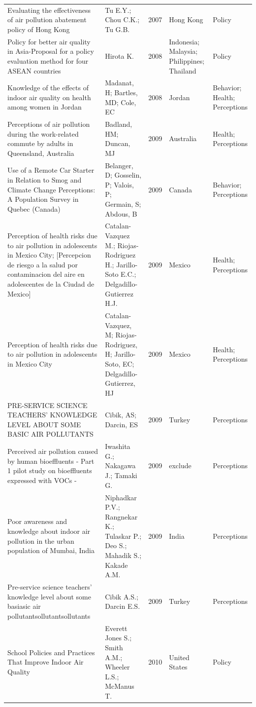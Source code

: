 {\begin{longtable}[t]{p{6cm}p{3cm}lp{3cm}p{3cm}}
Evaluating the effectiveness of air pollution abatement policy of Hong Kong & Tu E.Y.; Chou C.K.; Tu G.B. & 2007 & Hong Kong & Policy\\
\addlinespace
Policy for better air quality in Asia-Proposal for a policy evaluation method for four ASEAN countries & Hirota K. & 2008 & Indonesia; Malaysia; Philippines; Thailand & Policy\\
Knowledge of the effects of indoor air quality on health among women in Jordan & Madanat, H; Bartles, MD; Cole, EC & 2008 & Jordan & Behavior; Health; Perceptions\\
Perceptions of air pollution during the work-related commute by adults in Queensland, Australia & Badland, HM; Duncan, MJ & 2009 & Australia & Health; Perceptions\\
Use of a Remote Car Starter in Relation to Smog and Climate Change Perceptions: A Population Survey in Quebec (Canada) & Belanger, D; Gosselin, P; Valois, P; Germain, S; Abdous, B & 2009 & Canada & Behavior; Perceptions\\
Perception of health risks due to air pollution in adolescents in Mexico City; [Percepcion de riesgo a la salud por contaminacion del aire en adolescentes de la Ciudad de Mexico] & Catalan-Vazquez M.; Riojas-Rodriguez H.; Jarillo-Soto E.C.; Delgadillo-Gutierrez H.J. & 2009 & Mexico & Health; Perceptions\\
\addlinespace
Perception of health risks due to air pollution in adolescents in Mexico City & Catalan-Vazquez, M; Riojas-Rodriguez, H; Jarillo-Soto, EC; Delgadillo-Gutierrez, HJ & 2009 & Mexico & Health; Perceptions\\
PRE-SERVICE SCIENCE TEACHERS' KNOWLEDGE LEVEL ABOUT SOME BASIC AIR POLLUTANTS & Cibik, AS; Darcin, ES & 2009 & Turkey & Perceptions\\
Perceived air pollution caused by human bioeffluents - Part 1 pilot study on bioeffluents expressed with VOCs - & Iwashita G.; Nakagawa J.; Tamaki G. & 2009 & exclude & Perceptions\\
Poor awareness and knowledge about indoor air pollution in the urban population of Mumbai, India & Niphadkar P.V.; Rangnekar K.; Tulaskar P.; Deo S.; Mahadik S.; Kakade A.M. & 2009 & India & Perceptions\\
Pre-service science teachers' knowledge level about some basiasic air pollutantsollutantsollutants & Cibik A.S.; Darcin E.S. & 2009 & Turkey & Perceptions\\
\addlinespace
School Policies and Practices That Improve Indoor Air Quality & Everett Jones S.; Smith A.M.; Wheeler L.S.; McManus T. & 2010 & United States & Policy\\

\end{longtable}}
